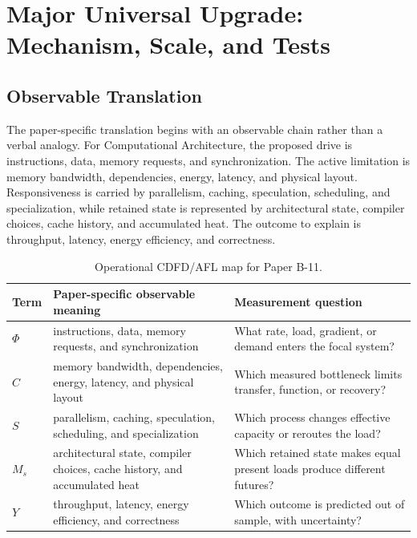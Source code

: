 \documentclass[11pt]{article}
\begin{document}
\section{Major Universal Upgrade: Mechanism, Scale, and Tests}

\subsection{Observable Translation}

The paper-specific translation begins with an observable chain rather than a
verbal analogy. For Computational Architecture, the proposed drive is instructions, data, memory requests, and synchronization.
The active limitation is memory bandwidth, dependencies, energy, latency, and physical layout. Responsiveness is carried by
parallelism, caching, speculation, scheduling, and specialization, while retained state is represented by
architectural state, compiler choices, cache history, and accumulated heat. The outcome to explain is throughput, latency, energy efficiency, and correctness.

\begin{table}[htbp]
\centering
\small
\caption{Operational CDFD/AFL map for Paper B-11.}
\begin{tabularx}{\textwidth}{|l|X|X|}
\hline
\textbf{Term} & \textbf{Paper-specific observable meaning} & \textbf{Measurement question} \\
\hline
$\Phi$ & instructions, data, memory requests, and synchronization & What rate, load, gradient, or demand enters the focal system? \\
\hline
$C$ & memory bandwidth, dependencies, energy, latency, and physical layout & Which measured bottleneck limits transfer, function, or recovery? \\
\hline
$S$ & parallelism, caching, speculation, scheduling, and specialization & Which process changes effective capacity or reroutes the load? \\
\hline
$M_s$ & architectural state, compiler choices, cache history, and accumulated heat & Which retained state makes equal present loads produce different futures? \\
\hline
$Y$ & throughput, latency, energy efficiency, and correctness & Which outcome is predicted out of sample, with uncertainty? \\
\hline
\end{tabularx}
\end{table}
\end{document}
